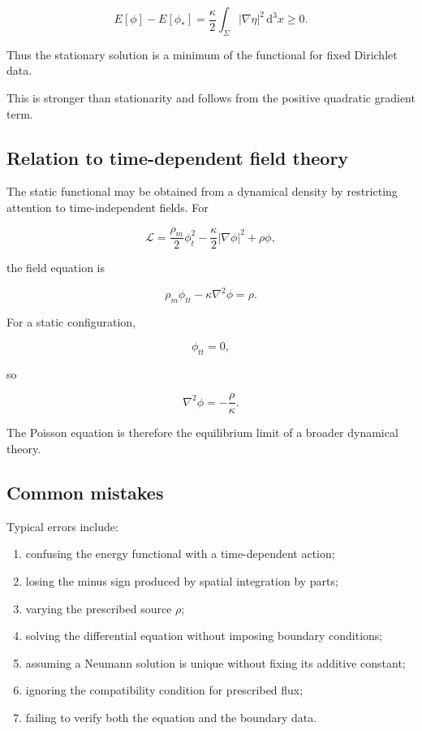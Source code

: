 \[
E[\phi]-E[\phi_{*}]
=
\frac{\kappa}{2}
\int_{\Sigma}
|\nabla\eta|^{2}
\,\mathrm{d}^{3}x
\geq 0.
\]

Thus the stationary solution is a minimum of the functional for fixed Dirichlet data.

This is stronger than stationarity and follows from the positive quadratic gradient term.

\subsection{Relation to time-dependent field theory}

The static functional may be obtained from a dynamical density by restricting attention to time-independent fields. For

\[
\mathcal{L}
=
\frac{\rho_{m}}{2}\phi_{t}^{2}
-
\frac{\kappa}{2}|\nabla\phi|^{2}
+
\rho\phi,
\]

the field equation is

\[
\rho_{m}\phi_{tt}
-
\kappa\nabla^{2}\phi
=
\rho.
\]

For a static configuration,

\[
\phi_{tt}=0,
\]

so

\[
\nabla^{2}\phi
=
-\frac{\rho}{\kappa}.
\]

The Poisson equation is therefore the equilibrium limit of a broader dynamical theory.

\subsection{Common mistakes}

Typical errors include:

\begin{enumerate}
    \item confusing the energy functional with a time-dependent action;
    \item losing the minus sign produced by spatial integration by parts;
    \item varying the prescribed source \(\rho\);
    \item solving the differential equation without imposing boundary conditions;
    \item assuming a Neumann solution is unique without fixing its additive constant;
    \item ignoring the compatibility condition for prescribed flux;
    \item failing to verify both the equation and the boundary data.
\end{enumerate}

